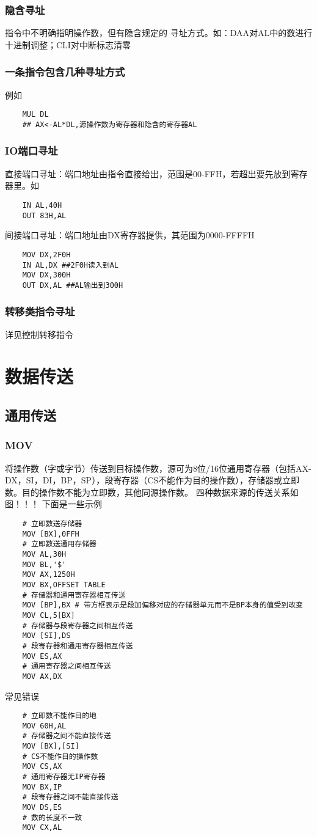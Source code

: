 \subsubsection{隐含寻址}
指令中不明确指明操作数，但有隐含规定的 寻址方式。如：DAA对AL中的数进行十进制调整；CLI对中断标志清零
\subsubsection{一条指令包含几种寻址方式}
例如
\begin{lstlisting}
    MUL DL 
    ## AX<-AL*DL,源操作数为寄存器和隐含的寄存器AL
\end{lstlisting}
\subsubsection{IO端口寻址}
直接端口寻址：端口地址由指令直接给出，范围是00-FFH，若超出要先放到寄存器里。如
\begin{lstlisting}
    IN AL,40H
    OUT 83H,AL
\end{lstlisting}
间接端口寻址：端口地址由DX寄存器提供，其范围为0000-FFFFH
\begin{lstlisting}
    MOV DX,2F0H
    IN AL,DX ##2F0H读入到AL
    MOV DX,300H
    OUT DX,AL ##AL输出到300H
\end{lstlisting}
\subsubsection{转移类指令寻址}
详见控制转移指令
\section{数据传送}
\subsection{通用传送}
\subsubsection{MOV}
将操作数（字或字节）传送到目标操作数，源可为8位/16位通用寄存器（包括AX-DX，SI，DI，BP，SP），段寄存器（CS不能作为目的操作数），存储器或立即数。目的操作数不能为立即数，其他同源操作数。
四种数据来源的传送关系如图！！！
下面是一些示例
\begin{lstlisting}
    # 立即数送存储器
    MOV [BX],0FFH
    # 立即数送通用存储器
    MOV AL,30H
    MOV BL,'$'
    MOV AX,1250H
    MOV BX,OFFSET TABLE
    # 存储器和通用寄存器相互传送
    MOV [BP],BX # 带方框表示是段加偏移对应的存储器单元而不是BP本身的值受到改变
    MOV CL,5[BX]
    # 存储器与段寄存器之间相互传送
    MOV [SI],DS
    # 段寄存器和通用寄存器相互传送
    MOV ES,AX
    # 通用寄存器之间相互传送
    MOV AX,DX
\end{lstlisting}
常见错误
\begin{lstlisting}
    # 立即数不能作目的地
    MOV 60H,AL
    # 存储器之间不能直接传送
    MOV [BX],[SI]
    # CS不能作目的操作数
    MOV CS,AX
    # 通用寄存器无IP寄存器
    MOV BX,IP
    # 段寄存器之间不能直接传送
    MOV DS,ES 
    # 数的长度不一致
    MOV CX,AL
\end{lstlisting}
